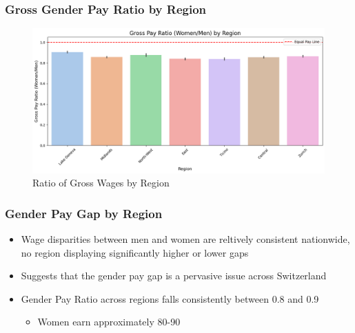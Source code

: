 \documentclass{beamer}
\begin{document}
\begin{frame}
\frametitle{Gross Gender Pay Ratio by Region}
\begin{center}
\begin{figure}[H]
    \includegraphics[width=\textwidth]{Figures/Gross_Ratio_Region.png}
    \caption{Ratio of Gross Wages by Region}
    \label{fig:ratio_region}
\end{figure}
\end{center}
\end{frame}

\begin{frame}
\frametitle{Gender Pay Gap by Region}
\begin{center}
  \begin{itemize}
    \item Wage disparities between men and women are reltively consistent nationwide, no region displaying significantly higher or lower gaps
    \item Suggests that the gender pay gap is a pervasive issue across Switzerland
    \item Gender Pay Ratio across regions falls consistently between 0.8 and 0.9
\begin{itemize}
    \item Women earn approximately 80-90%
\end{itemize} 
\end{itemize} 
\end{center}
\end{frame}
\end{document}
